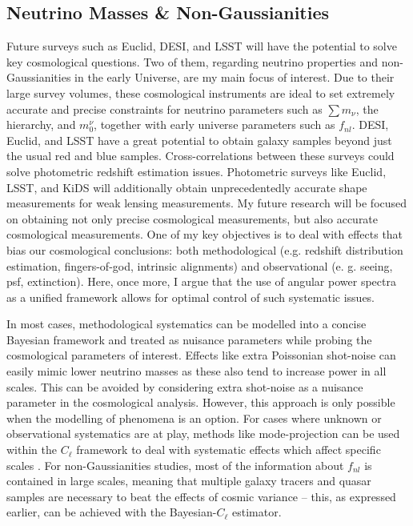 \subsection{Neutrino Masses \& Non-Gaussianities}\label{Sec:Concl:NeutrinoFnl}
Future surveys such as Euclid, DESI, and LSST will have the potential to solve key cosmological questions. Two of them, regarding neutrino properties and non-Gaussianities in the early Universe, are my main focus of interest. Due to their large survey volumes, these cosmological instruments are ideal to set extremely accurate and precise constraints for neutrino parameters such as $\sum m_{\nu}$, the hierarchy, and $m_{0}^{\nu}$, together with early universe parameters such as $f_{nl}$. DESI, Euclid, and LSST have a great potential to obtain galaxy samples beyond just the usual red and blue samples. Cross-correlations between these surveys could solve photometric redshift estimation issues. Photometric surveys like Euclid, LSST, and KiDS will additionally obtain unprecedentedly accurate shape measurements for weak lensing measurements. My future research will be focused on obtaining not only precise cosmological measurements, but also accurate cosmological measurements. One of my key objectives is to deal with effects that bias our cosmological conclusions: both methodological (e.g. redshift distribution estimation, fingers-of-god, intrinsic alignments) and observational (e. g. seeing, psf, extinction). Here, once more, I argue that the use of angular power spectra as a unified framework allows for optimal control of such systematic issues.

\qquad In most cases, methodological systematics can be modelled into a concise Bayesian framework and treated as nuisance parameters while probing the cosmological parameters of interest. Effects like extra Poissonian shot-noise can easily mimic lower neutrino masses as these also tend to increase power in all scales. This can be avoided by considering extra shot-noise as a nuisance parameter in the cosmological analysis. However, this approach is only possible when the modelling of phenomena is an option. For cases where unknown or observational systematics are at play, methods like mode-projection can be used within the $C_{\ell}$ framework to deal with systematic effects which affect specific scales \citep{Boris2013}. For non-Gaussianities studies, most of the information about $f_{nl}$ is contained in large scales, meaning that multiple galaxy tracers and quasar samples are necessary to beat the effects of cosmic variance -- this, as expressed earlier, can be achieved with the Bayesian-$C_{\ell}$ estimator.

